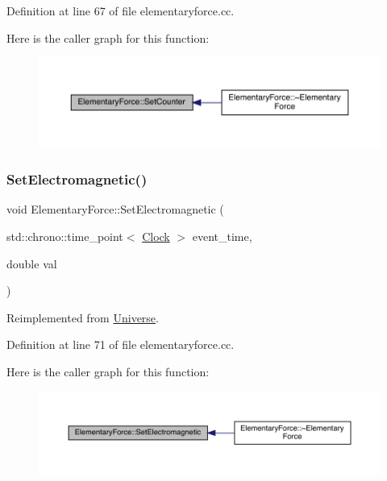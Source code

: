Definition at line 67 of file elementaryforce.\+cc.

Here is the caller graph for this function\+:
\nopagebreak
\begin{figure}[H]
\begin{center}
\leavevmode
\includegraphics[width=350pt]{class_elementary_force_a3762cf66ed266b310446417215dec3fa_icgraph}
\end{center}
\end{figure}
\mbox{\label{class_elementary_force_a67f6845bd715c29c17387d291b343a1b}} 
\subsubsection{\texorpdfstring{Set\+Electromagnetic()}{SetElectromagnetic()}}
{\footnotesize\ttfamily void Elementary\+Force\+::\+Set\+Electromagnetic (\begin{DoxyParamCaption}\item[{std\+::chrono\+::time\+\_\+point$<$ \hyperlink{universe_8h_a0ef8d951d1ca5ab3cfaf7ab4c7a6fd80}{Clock} $>$}]{event\+\_\+time,  }\item[{double}]{val }\end{DoxyParamCaption})\hspace{0.3cm}{\ttfamily [virtual]}}



Reimplemented from \hyperlink{class_universe_aa981fc7e252b1fbbb675f0371860954d}{Universe}.



Definition at line 71 of file elementaryforce.\+cc.

Here is the caller graph for this function\+:
\nopagebreak
\begin{figure}[H]
\begin{center}
\leavevmode
\includegraphics[width=350pt]{class_elementary_force_a67f6845bd715c29c17387d291b343a1b_icgraph}
\end{center}
\end{figure}
\mbox{\label{class_elementary_force_af4f12038c33d7edf9f13339fcd632ec9}} 

